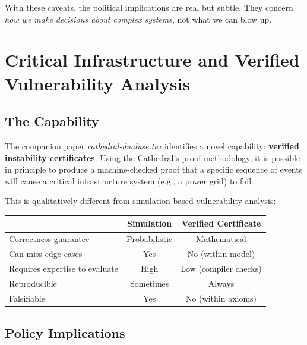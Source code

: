 \documentclass[11pt,a4paper]{article}
\begin{document}
With these caveats, the political implications are real but
subtle. They concern \emph{how we make decisions about complex
systems}, not what we can blow up.

\section{Critical Infrastructure and Verified Vulnerability Analysis}
\label{sec:infrastructure}

\subsection{The Capability}

The companion paper \emph{cathedral-dualuse.tex} identifies a novel
capability: \textbf{verified instability certificates}. Using the
Cathedral's proof methodology, it is possible in principle to
produce a machine-checked proof that a specific sequence of
events will cause a critical infrastructure system (e.g., a power
grid) to fail.

This is qualitatively different from simulation-based vulnerability
analysis:

\begin{center}
\begin{tabular}{@{}lcc@{}}
\toprule
& \textbf{Simulation} & \textbf{Verified Certificate} \\
\midrule
Correctness guarantee & Probabilistic & Mathematical \\
Can miss edge cases & Yes & No (within model) \\
Requires expertise to evaluate & High & Low (compiler checks) \\
Reproducible & Sometimes & Always \\
Falsifiable & Yes & No (within axioms) \\
\bottomrule
\end{tabular}
\end{center}

\subsection{Policy Implications}
\end{document}
